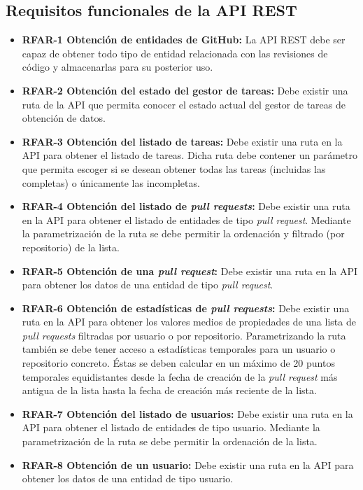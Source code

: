 \subsection{Requisitos funcionales de la API REST}

\begin{itemize}
	\item \textbf{RFAR-1 Obtención de entidades de GitHub:} La API REST debe ser capaz de obtener todo tipo de entidad relacionada con las revisiones de código y almacenarlas para su posterior uso.
	\item \textbf{RFAR-2 Obtención del estado del gestor de tareas:} Debe existir una ruta de la API que permita conocer el estado actual del gestor de tareas de obtención de datos.
	\item \textbf{RFAR-3 Obtención del listado de tareas:} Debe existir una ruta en la API para obtener el listado de tareas. Dicha ruta debe contener un parámetro que permita escoger si se desean obtener todas las tareas (incluidas las completas) o únicamente las incompletas.
	\item \textbf{RFAR-4 Obtención del listado de \textit{pull requests}:} Debe existir una ruta en la API para obtener el listado de entidades de tipo \textit{pull request}. Mediante la parametrización de la ruta se debe permitir la ordenación y filtrado (por repositorio) de la lista.
	\item \textbf{RFAR-5 Obtención de una \textit{pull request}:} Debe existir una ruta en la API para obtener los datos de una entidad de tipo \textit{pull request}.
	\item \textbf{RFAR-6 Obtención de estadísticas de \textit{pull requests}:} Debe existir una ruta en la API para obtener los valores medios de propiedades de una lista de \textit{pull requests} filtradas por usuario o por repositorio. Parametrizando la ruta también se debe tener acceso a estadísticas temporales para un usuario o repositorio concreto. Éstas se deben calcular en un máximo de 20 puntos temporales equidistantes desde la fecha de creación de la \textit{pull request} más antigua de la lista hasta la fecha de creación más reciente de la lista.
	\item \textbf{RFAR-7 Obtención del listado de usuarios:} Debe existir una ruta en la API para obtener el listado de entidades de tipo usuario. Mediante la parametrización de la ruta se debe permitir la ordenación de la lista.
	\item \textbf{RFAR-8 Obtención de un usuario:} Debe existir una ruta en la API para obtener los datos de una entidad de tipo usuario.

\end{itemize}
